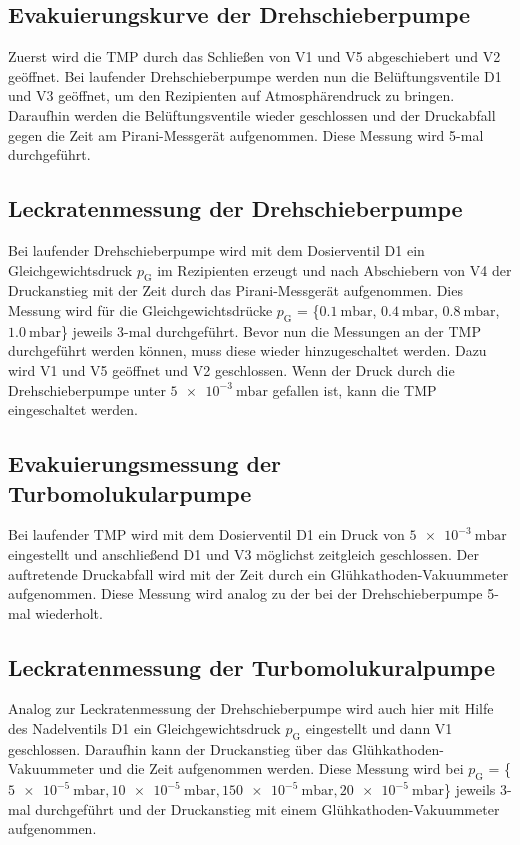 \subsection{Evakuierungskurve der Drehschieberpumpe}
Zuerst wird die TMP durch das Schließen von V1 und V5 abgeschiebert und V2 geöffnet.
Bei laufender Drehschieberpumpe werden nun die Belüftungsventile D1 und V3 geöffnet,
um den Rezipienten auf Atmosphärendruck zu bringen. Daraufhin werden die Belüftungsventile
wieder geschlossen und der Druckabfall gegen die Zeit am Pirani-Messgerät aufgenommen.
Diese Messung wird 5-mal durchgeführt.

\subsection{Leckratenmessung der Drehschieberpumpe}
Bei laufender Drehschieberpumpe wird mit dem Dosierventil D1 ein Gleichgewichtsdruck $p_\text{G}$
im Rezipienten erzeugt und nach Abschiebern von V4 der Druckanstieg mit der Zeit durch
das Pirani-Messgerät aufgenommen. Dies Messung wird für die Gleichgewichtsdrücke
$p_\text{G}$ = \{$\SI{0.1}{\milli\bar}$, $\SI{0.4}{\milli\bar}$, $\SI{0.8}{\milli\bar}$,
$\SI{1.0}{\milli\bar}$\} jeweils 3-mal durchgeführt.
Bevor nun die Messungen an der TMP durchgeführt werden können, muss diese wieder
hinzugeschaltet werden. Dazu wird V1 und V5 geöffnet und V2 geschlossen. Wenn der
Druck durch die Drehschieberpumpe unter $\SI{5e-3}{\milli\bar}$ gefallen ist, kann
die TMP eingeschaltet werden.

\subsection{Evakuierungsmessung der Turbomolukularpumpe}
Bei laufender TMP wird mit dem Dosierventil D1 ein Druck von $\SI{5e-3}{\milli\bar}$ eingestellt
und anschließend D1 und V3 möglichst zeitgleich geschlossen. Der auftretende Druckabfall
wird mit der Zeit durch ein Glühkathoden-Vakuummeter aufgenommen. Diese Messung
wird analog zu der bei der Drehschieberpumpe 5-mal wiederholt.

\subsection{Leckratenmessung der Turbomolukuralpumpe}
Analog zur Leckratenmessung  der Drehschieberpumpe wird auch hier mit Hilfe des Nadelventils
D1 ein Gleichgewichtsdruck $p_\text{G}$ eingestellt und dann V1 geschlossen. Daraufhin
kann der Druckanstieg über das Glühkathoden-Vakuummeter und die Zeit aufgenommen werden.
Diese Messung wird bei $p_\text{G}$ = \{$\SI{5e-5}{\milli\bar}, \SI{10e-5}{\milli\bar},
\SI{150e-5}{\milli\bar}, \SI{20e-5}{\milli\bar}$\} jeweils 3-mal durchgeführt und der Druckanstieg mit einem
Glühkathoden-Vakuummeter aufgenommen.

